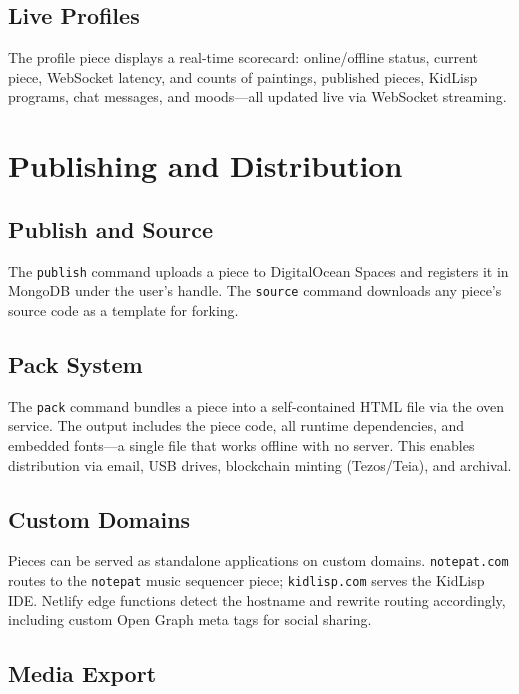 \documentclass[10pt,letterpaper,twocolumn]{article}
\begin{document}
\subsection{Live Profiles}

The profile piece displays a real-time scorecard: online/offline status, current piece, WebSocket latency, and counts of paintings, published pieces, KidLisp programs, chat messages, and moods---all updated live via WebSocket streaming.


\section{Publishing and Distribution}
\label{sec:publishing}

\subsection{Publish and Source}

The \texttt{publish} command uploads a piece to DigitalOcean Spaces and registers it in MongoDB under the user's handle. The \texttt{source} command downloads any piece's source code as a template for forking.

\subsection{Pack System}

The \texttt{pack} command bundles a piece into a self-contained HTML file via the oven service. The output includes the piece code, all runtime dependencies, and embedded fonts---a single file that works offline with no server. This enables distribution via email, USB drives, blockchain minting (Tezos/Teia), and archival.

\subsection{Custom Domains}

Pieces can be served as standalone applications on custom domains. \texttt{notepat.com} routes to the \texttt{notepat} music sequencer piece; \texttt{kidlisp.com} serves the KidLisp IDE. Netlify edge functions detect the hostname and rewrite routing accordingly, including custom Open Graph meta tags for social sharing.

\subsection{Media Export}
\end{document}
